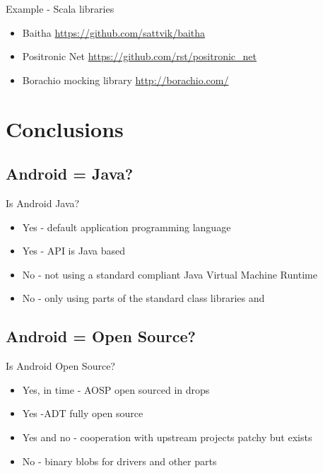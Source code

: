 \documentclass[aspectratio=169]{beamer}
\newcommand{\surl}[1] {{\tiny \url{#1}}}
\begin{document}
    \begin{frame}{Example - Scala libraries}
      \begin{itemize}
       \item Baitha \surl{https://github.com/sattvik/baitha}
       \item Positronic Net \surl{https://github.com/rst/positronic_net}
       \item Borachio mocking library \surl{http://borachio.com/}
      \end{itemize}
    \end{frame}

\section{Conclusions}

  \subsection{Android = Java?}
    \begin{frame}{Is Android Java?}
      \begin{itemize}
      \item<1-> Yes - default application programming language
      \item<2-> Yes - API is Java based
      \item<3-> No - not using a standard compliant Java Virtual Machine Runtime
      \item<4-> No - only using parts of the standard class libraries and 
      \end{itemize}
    \end{frame}

  \subsection{Android = Open Source?}
    \begin{frame}{Is Android Open Source?}
      \begin{itemize}
       \item<1-> Yes, in time - AOSP open sourced in drops
       \item<2-> Yes -ADT fully open source
       \item<3-> Yes and no - cooperation with upstream projects patchy but exists
       \item<4-> No - binary blobs for drivers and other parts
      \end{itemize}
    \end{frame}
\end{document}
